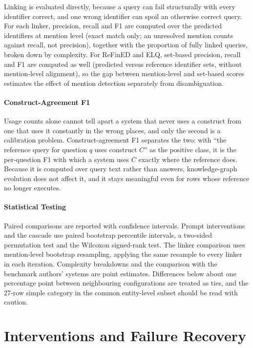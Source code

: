 Linking is evaluated directly, because a query can fail structurally with every identifier correct, and one wrong identifier can spoil an otherwise correct query.
For each linker, precision, recall and F1 are computed over the predicted identifiers at mention level (exact match only; an unresolved mention counts against recall, not precision), together with the proportion of fully linked queries, broken down by complexity.
For ReFinED and ELQ, set-based precision, recall and F1 are computed as well (predicted versus reference identifier sets, without mention-level alignment), so the gap between mention-level and set-based scores estimates the effect of mention detection separately from disambiguation.

\paragraph{Construct-Agreement F1}

Usage counts alone cannot tell apart a system that never uses a construct from one that uses it constantly in the wrong places, and only the second is a calibration problem.
Construct-agreement F1 separates the two: with ``the reference query for question $q$ uses construct $C$'' as the positive class, it is the per-question F1 with which a system uses $C$ exactly where the reference does.
Because it is computed over query text rather than answers, knowledge-graph evolution does not affect it, and it stays meaningful even for rows whose reference no longer executes.

\paragraph{Statistical Testing}

Paired comparisons are reported with confidence intervals.
Prompt interventions and the cascade use paired bootstrap percentile intervals, a two-sided permutation test and the Wilcoxon signed-rank test.
The linker comparison uses mention-level bootstrap resampling, applying the same resample to every linker in each iteration.
Complexity breakdowns and the comparison with the benchmark authors' systems are point estimates.
Differences below about one percentage point between neighbouring configurations are treated as ties, and the 27-row simple category in the common entity-level subset should be read with caution.

\section{Interventions and Failure
Recovery}

